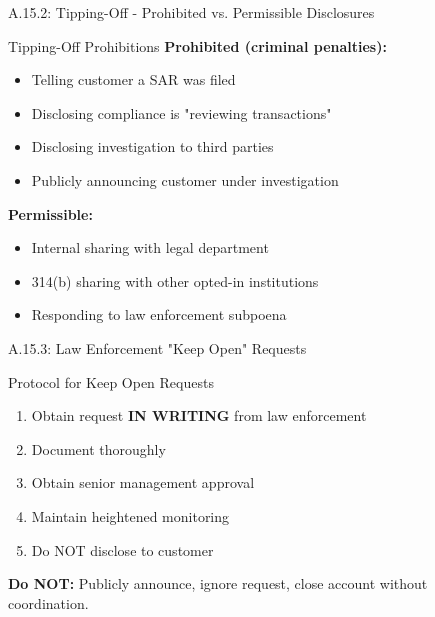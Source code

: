 \documentclass{beamer}
\begin{document}
	\begin{frame}{A.15.2: Tipping-Off - Prohibited vs. Permissible Disclosures}
		\begin{block}{Tipping-Off Prohibitions}
			\textbf{Prohibited (criminal penalties):}
			\begin{itemize}
				\item Telling customer a SAR was filed
				\item Disclosing compliance is "reviewing transactions"
				\item Disclosing investigation to third parties
				\item Publicly announcing customer under investigation
			\end{itemize}
			\textbf{Permissible:}
			\begin{itemize}
				\item Internal sharing with legal department
				\item 314(b) sharing with other opted-in institutions
				\item Responding to law enforcement subpoena
			\end{itemize}
		\end{block}
	\end{frame}
	
	\begin{frame}{A.15.3: Law Enforcement "Keep Open" Requests}
		\begin{block}{Protocol for Keep Open Requests}
			\begin{enumerate}
				\item Obtain request \textbf{IN WRITING} from law enforcement
				\item Document thoroughly
				\item Obtain senior management approval
				\item Maintain heightened monitoring
				\item Do NOT disclose to customer
			\end{enumerate}
		\end{block}
		\textbf{Do NOT:} Publicly announce, ignore request, close account without coordination.
	\end{frame}
	
	
\end{document}
